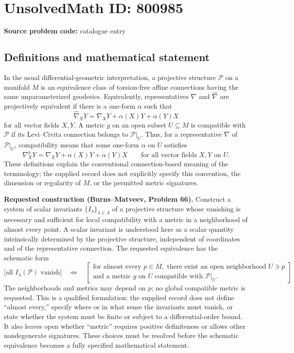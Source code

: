 \documentclass[11pt]{article}
\begin{document}
\section*{UnsolvedMath ID: 800985}
\textbf{Source problem code:} catalogue entry
\subsection{Definitions and mathematical statement}
In the usual differential-geometric interpretation, a projective structure \(\mathcal P\) on a manifold \(M\) is an equivalence class of torsion-free affine connections having the same unparameterized geodesics. Equivalently, representatives \(\nabla\) and \(\widehat\nabla\) are projectively equivalent if there is a one-form \(\alpha\) such that
\[
\widehat\nabla_XY=\nabla_XY+\alpha(X)Y+\alpha(Y)X
\]
for all vector fields \(X,Y\). A metric \(g\) on an open subset \(U\subseteq M\) is compatible with \(\mathcal P\) if its Levi--Civita connection belongs to \(\mathcal P|_U\). Thus, for a representative \(\nabla\) of \(\mathcal P|_U\), compatibility means that some one-form \(\alpha\) on \(U\) satisfies
\[
\nabla^g_XY=\nabla_XY+\alpha(X)Y+\alpha(Y)X
\qquad\text{for all vector fields }X,Y\text{ on }U.
\]
These definitions explain the conventional connection-based meaning of the terminology; the supplied record does not explicitly specify this convention, the dimension or regularity of \(M\), or the permitted metric signatures.

\textbf{Requested construction (Burns--Matveev, Problem 66).} Construct a system of scalar invariants \(\{I_\lambda\}_{\lambda\in\Lambda}\) of a projective structure whose vanishing is necessary and sufficient for local compatibility with a metric in a neighborhood of almost every point. A scalar invariant is understood here as a scalar quantity intrinsically determined by the projective structure, independent of coordinates and of the representative connection. The requested equivalence has the schematic form
\[
\bigl[\text{all }I_\lambda(\mathcal P)\text{ vanish}\bigr]
\quad\Longleftrightarrow\quad
\left[
\begin{gathered}
\text{for almost every }p\in M,\text{ there exist an open neighborhood }U\ni p\\
\text{and a metric }g\text{ on }U\text{ compatible with }\mathcal P|_U.
\end{gathered}
\right]
\]
The neighborhoods and metrics may depend on \(p\); no global compatible metric is requested. This is a qualified formulation: the supplied record does not define ``almost every,'' specify where or in what sense the invariants must vanish, or state whether the system must be finite or subject to a differential-order bound. It also leaves open whether ``metric'' requires positive definiteness or allows other nondegenerate signatures. These choices must be resolved before the schematic equivalence becomes a fully specified mathematical statement.
\end{document}
